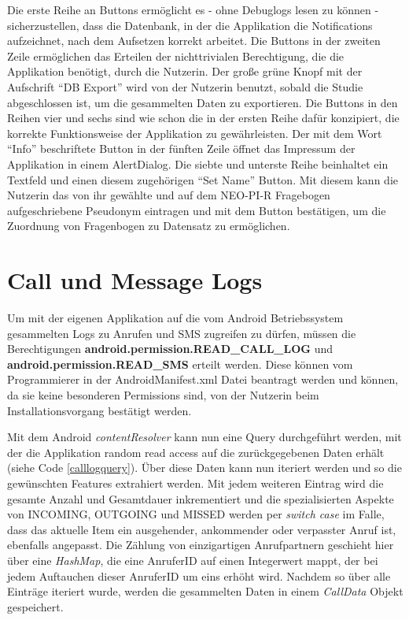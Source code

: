 Die erste Reihe an Buttons ermöglicht es - ohne Debuglogs lesen zu können - sicherzustellen, dass die Datenbank, in der die Applikation die Notifications aufzeichnet, nach dem Aufsetzen korrekt arbeitet.
Die Buttons in der zweiten Zeile ermöglichen das Erteilen der nichttrivialen Berechtigung, die die Applikation benötigt, durch die Nutzerin.
Der große grüne Knopf mit der Aufschrift "`DB Export"' wird von der Nutzerin benutzt, sobald die Studie abgeschlossen ist, um die gesammelten Daten zu exportieren.
Die Buttons in den Reihen vier und sechs sind wie schon die in der ersten Reihe dafür konzipiert, die korrekte Funktionsweise der Applikation zu gewährleisten.
Der mit dem Wort "`Info"' beschriftete Button in der fünften Zeile öffnet das Impressum der Applikation in einem AlertDialog.
Die siebte und unterste Reihe beinhaltet ein Textfeld und einen diesem zugehörigen "`Set Name"' Button.
Mit diesem kann die Nutzerin das von ihr gewählte und auf dem NEO-PI-R Fragebogen aufgeschriebene Pseudonym eintragen und mit dem Button bestätigen, um die Zuordnung von Fragenbogen zu Datensatz zu ermöglichen.
\section{Call und Message Logs}

Um mit der eigenen Applikation auf die vom Android Betriebssystem gesammelten Logs zu Anrufen und SMS zugreifen zu dürfen, müssen die Berechtigungen 
\textbf{android.permission.READ\_CALL\_LOG} und \textbf{android.permission.READ\_SMS} erteilt werden.
Diese können vom Programmierer in der AndroidManifest.xml Datei beantragt werden und können, da sie keine besonderen Permissions sind,
von der Nutzerin beim Installationsvorgang bestätigt werden.
\par
Mit dem Android \emph{contentResolver} kann nun eine Query durchgeführt werden, mit der die Applikation random read access auf die zurückgegebenen Daten erhält (siehe Code \ref{calllogquery}).
Über diese Daten kann nun iteriert werden und so die gewünschten Features extrahiert werden.
Mit jedem weiteren Eintrag wird die gesamte Anzahl und Gesamtdauer inkrementiert und die spezialisierten Aspekte von INCOMING, OUTGOING und MISSED werden per \emph{switch case} im Falle, dass das aktuelle Item ein ausgehender, ankommender oder verpasster Anruf ist, ebenfalls angepasst.
Die Zählung von einzigartigen Anrufpartnern geschieht hier über eine \emph{HashMap}, die eine AnruferID auf einen Integerwert mappt, der bei jedem Auftauchen dieser AnruferID um eins erhöht wird.
Nachdem so über alle Einträge iteriert wurde, werden die gesammelten Daten in einem \emph{CallData} Objekt gespeichert.
\par


